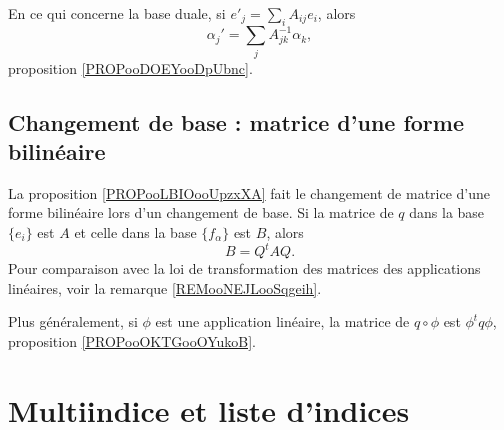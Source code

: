En ce qui concerne la base duale, si \( e'_j=\sum_iA_{ij}e_i\), alors
\begin{equation}
	\alpha_j'=\sum_{j}A_{jk}^{-1}\alpha_k,
\end{equation}
proposition \ref{PROPooDOEYooDpUbnc}.

\subsection{Changement de base : matrice d'une forme bilinéaire}

La proposition \ref{PROPooLBIOooUpzxXA} fait le changement de matrice d'une forme bilinéaire lors d'un changement de base. Si la matrice de \( q\) dans la base \( \{ e_i \}\) est \( A\) et celle dans la base \( \{ f_{\alpha} \}\) est \( B\), alors
\begin{equation}
	B=Q^tAQ.
\end{equation}
Pour comparaison avec la loi de transformation des matrices des applications linéaires, voir la remarque \ref{REMooNEJLooSqgeih}.

Plus généralement, si \( \phi\) est une application linéaire, la matrice de \( q\circ \phi\) est \( \phi^tq\phi\), proposition \ref{PROPooOKTGooOYukoB}.

\section{Multiindice et liste d'indices}

